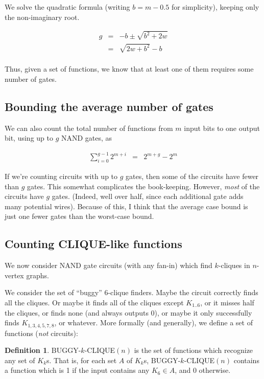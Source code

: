 \documentclass[12pt]{article}
\theoremstyle{definition}
\newtheorem{defn}{Definition}[section]
\begin{document}
We solve the quadratic formula (writing $b = m-0.5$ for simplicity), keeping
only the non-imaginary root.

\begin{eqnarray*}
g & = & -b \pm \sqrt{ b^2 + 2w} \\
  & = & {\sqrt {2w + b^2}} - b \\
\end{eqnarray*}

Thus, given a set of functions, we know that at least one of them requires
some number of gates.

\subsection{Bounding the average number of gates}

We can also count the total number of functions from $m$ input bits to one
output bit, using up to $g$ NAND gates, as

\begin{eqnarray*}
\sum_{i=0}^{g-1} 2^{m+i} & = & 2^{m+g} - 2^m
\end{eqnarray*}

If we're counting circuits with up to $g$ gates, then some of the circuits
have fewer than $g$ gates. This somewhat complicates the book-keeping.
However, {\em most} of the
circuits have $g$ gates. (Indeed, well over half, since each additional
gate adds many potential wires). Because of this, I think that the
average case bound is just one fewer gates than the worst-case bound.


\subsection{Counting CLIQUE-like functions}

We now consider NAND gate circuits (with any fan-in) which find $k$-cliques in $n$-vertex
graphs.

We consider the set of ``buggy'' 6-clique finders. 
Maybe the circuit correctly
finds all the cliques. Or maybe it finds all of the cliques except $K_{1..6}$,
or it misses half the cliques, or finds none (and always outputs 0), or maybe
it only successfully finds $K_{1,3,4,5,7,8}$, or whatever. More formally
(and generally),
we define a set of functions ({\em not} circuits):

\begin{defn}
\label{BUGGY-k-CLIQUE}
BUGGY-$k$-CLIQUE$(n)$ is the set of functions which recognize any set
of $K_k$s. That is, for each set $A$ of $K_k$s, BUGGY-$k$-CLIQUE$(n)$
contains a function which is 1 if the input contains any $K_6 \in A$,
and 0 otherwise.
\end{defn}
\end{document}
